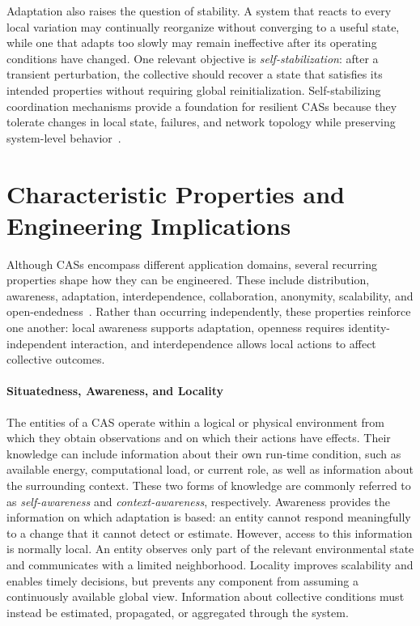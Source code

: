 Adaptation also raises the question of stability. 
%
A system that reacts to every local variation 
 may continually reorganize  without converging to a useful state,
 while one that adapts too slowly may remain ineffective after 
 its operating conditions have changed. 
%
One relevant objective is \emph{self-stabilization}:
 after a transient perturbation, the collective should recover a state that satisfies 
 its intended properties without requiring global reinitialization.
%
Self-stabilizing coordination mechanisms provide a foundation for resilient \glspl{CAS}
 because they tolerate changes in local state, failures, and network topology
 while preserving system-level behavior~\cite{DBLP:journals/tomacs/ViroliABDP18}.

\section{Characteristic Properties and Engineering Implications}
\label{subsec:cas-properties}

Although \glspl{CAS} encompass different application domains, 
 several recurring properties shape how they can be engineered.
%
These include distribution, awareness, adaptation, interdependence, 
 collaboration, anonymity, scalability, and open-endedness~\cite{DBLP:journals/scp/AlrahmanNL20}.
%
Rather than occurring independently, these properties reinforce one another:
 local awareness supports adaptation, openness requires identity-independent
 interaction, and interdependence allows local actions to affect collective
 outcomes.

\paragraph{Situatedness, Awareness, and Locality}
The entities of a \gls{CAS} operate within a logical or physical environment
 from which they obtain observations and on which their actions have effects.
%
Their knowledge can include information about their own run-time condition,
 such as available energy, computational load, or current role, as well as
 information about the surrounding context.
%
These two forms of knowledge are commonly referred to as
 \emph{self-awareness} and \emph{context-awareness}, respectively.
%
Awareness provides the information on which adaptation is based: an entity
 cannot respond meaningfully to a change that it cannot detect or estimate.
%
However, access to this information is normally local.
%
An entity observes only part of the relevant environmental state and
 communicates with a limited neighborhood.
%
Locality improves scalability and enables timely decisions, but prevents any
 component from assuming a continuously available global view.
%
Information about collective conditions must instead be estimated, propagated,
 or aggregated through the system.

